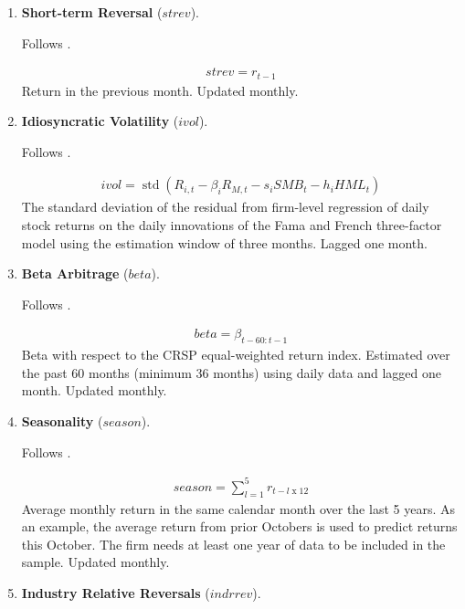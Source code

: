 \begin{enumerate}
	
	
	\item \textbf{Short-term Reversal} ($strev$). 
	
	Follows . 
	
	\begin{align*}
		strev = r_{t-1}
	\end{align*}	
	Return in the previous month. Updated monthly.
	
	
	
	\item \textbf{Idiosyncratic Volatility} ($ivol$). 
	
	Follows . 
	
	\begin{align*}
		ivol = \operatorname{std} \left( R_{i,t} - \beta_i R_{M,t} - s_i SMB_t - h_i HML_t \right)
	\end{align*}
	The standard deviation of the residual from firm-level regression of daily stock returns on the daily innovations of the Fama and French three-factor model using the estimation window of three months. Lagged one month.
	


	\item \textbf{Beta Arbitrage} ($beta$). 
	
	Follows . 
	
	\begin{align*}
		beta = \beta_{t-60:t-1}
	\end{align*}
	Beta with respect to the CRSP equal-weighted return index. Estimated over the past 60 months (minimum 36 months) using daily data and lagged one month. Updated monthly.
	
	
		
	\item \textbf{Seasonality} ($season$). 
	
	Follows . 
	
	\begin{align*}
		season = \sum_{l=1}^5 r_{t-l\operatorname{x}12}
	\end{align*}
	Average monthly return in the same calendar month over the last 5 years. As an example, the average return from prior Octobers is used to predict returns this October. The firm needs at least one year of data to be included in the sample. Updated monthly.
	
	
	
	\item \textbf{Industry Relative Reversals} ($indrrev$). 
	

\end{enumerate}
